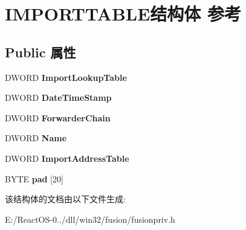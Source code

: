 \hypertarget{struct_i_m_p_o_r_t_t_a_b_l_e}{}\section{I\+M\+P\+O\+R\+T\+T\+A\+B\+L\+E结构体 参考}
\label{struct_i_m_p_o_r_t_t_a_b_l_e}
\subsection*{Public 属性}
\begin{DoxyCompactItemize}
\item 
\mbox{\label{struct_i_m_p_o_r_t_t_a_b_l_e_a1575a57d8081d486330cc3ece68ade6d}} 
D\+W\+O\+RD {\bfseries Import\+Lookup\+Table}
\item 
\mbox{\label{struct_i_m_p_o_r_t_t_a_b_l_e_a06f50095bd31a34892fa7747823db4c4}} 
D\+W\+O\+RD {\bfseries Date\+Time\+Stamp}
\item 
\mbox{\label{struct_i_m_p_o_r_t_t_a_b_l_e_a75156134902daedd903c6a06138477c2}} 
D\+W\+O\+RD {\bfseries Forwarder\+Chain}
\item 
\mbox{\label{struct_i_m_p_o_r_t_t_a_b_l_e_a2a67f432d767ea5e9f18f65a90d5d243}} 
D\+W\+O\+RD {\bfseries Name}
\item 
\mbox{\label{struct_i_m_p_o_r_t_t_a_b_l_e_a1e0301b3b68f4b66ae77681ae2a38309}} 
D\+W\+O\+RD {\bfseries Import\+Address\+Table}
\item 
\mbox{\label{struct_i_m_p_o_r_t_t_a_b_l_e_a64b92371b53bdaab38d8b95d2eaaa415}} 
B\+Y\+TE {\bfseries pad} \mbox{[}20\mbox{]}
\end{DoxyCompactItemize}


该结构体的文档由以下文件生成\+:\begin{DoxyCompactItemize}
\item 
E\+:/\+React\+O\+S-\/0../dll/win32/fusion/fusionpriv.\+h\end{DoxyCompactItemize}
